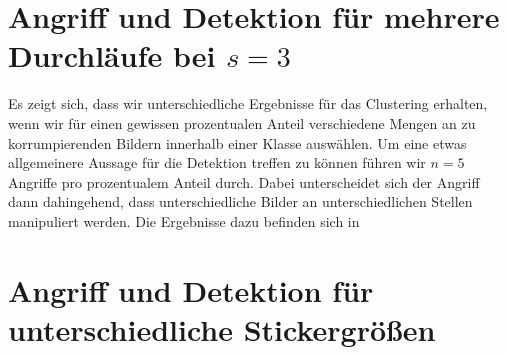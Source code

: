 \documentclass[11pt,a4paper]{article}
\numberwithin{equation}{section}
\begin{document}
	\section{Angriff und Detektion für mehrere Durchläufe bei $s=3$}
	Es zeigt sich, dass wir unterschiedliche Ergebnisse für das Clustering erhalten, wenn wir für einen gewissen prozentualen Anteil verschiedene Mengen an zu korrumpierenden Bildern innerhalb einer Klasse auswählen. Um eine etwas allgemeinere Aussage für die Detektion treffen zu können führen wir $n=5$ Angriffe pro prozentualem Anteil durch. Dabei unterscheidet sich der Angriff dann dahingehend, dass unterschiedliche Bilder an unterschiedlichen Stellen manipuliert werden.
	Die Ergebnisse dazu befinden sich in 
	
	\begin{table}[ht]
		\begin{center}
			\label{tab:ergebnisse_SPA_s3_gemittelt}
			\caption{Gemittelte Detektionsraten für Angriffe mit dem Standard-Sticker und $s=3$.}
		\end{center}
	\end{table}
	
	
	\section{Angriff und Detektion für unterschiedliche Stickergrößen} \label{unterschiedlicheStickergrößen}
	
\end{document}
